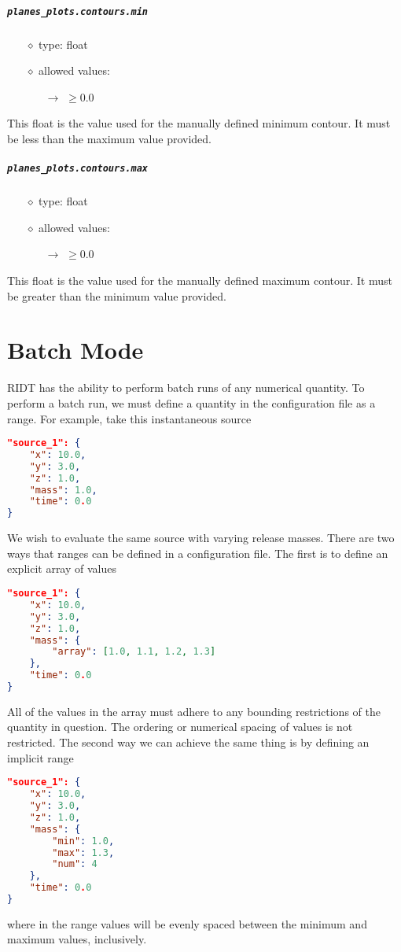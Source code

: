 \documentclass[]{article}
\def\code#1{\texttt{#1}}
\begin{document}
\subparagraph{\code{planes\_plots.contours.min}}
\begin{itemize}
    \item[$\diamond$] type: float 
    \item[$\diamond$] allowed values:
    \begin{itemize}
        \item[$\rightarrow$] $\geq0.0$
    \end{itemize}
\end{itemize}
This float is the value used for the manually defined minimum contour. It must
be less than the maximum value provided.

\subparagraph{\code{planes\_plots.contours.max}}
\begin{itemize}
    \item[$\diamond$] type: float 
    \item[$\diamond$] allowed values:
    \begin{itemize}
        \item[$\rightarrow$] $\geq0.0$
    \end{itemize}
\end{itemize}
This float is the value used for the manually defined maximum contour. It must
be greater than the minimum value provided.

\section{Batch Mode}
RIDT has the ability to perform batch runs of any numerical quantity. To perform
a batch run, we must define a quantity in the configuration file as a range.
For example, take this instantaneous source\\
\begin{lstlisting}[language=json,firstnumber=1]
"source_1": {
    "x": 10.0,
    "y": 3.0,
    "z": 1.0,
    "mass": 1.0,
    "time": 0.0
}
\end{lstlisting}
\medskip
We wish to evaluate the same source with varying release masses. There are two
ways that ranges can be defined in a configuration file. The first is to define
an explicit array of values\\
\begin{lstlisting}[language=json,firstnumber=1]
"source_1": {
    "x": 10.0,
    "y": 3.0,
    "z": 1.0,
    "mass": {
        "array": [1.0, 1.1, 1.2, 1.3]
    },
    "time": 0.0
}
\end{lstlisting}
\medskip
All of the values in the array must adhere to any bounding restrictions of the
quantity in question. The ordering or numerical spacing of values is not
restricted. The second way we can achieve the same thing is by defining an
implicit range\\
\begin{lstlisting}[language=json,firstnumber=1]
"source_1": {
    "x": 10.0,
    "y": 3.0,
    "z": 1.0,
    "mass": {
        "min": 1.0,
        "max": 1.3,
        "num": 4
    },
    "time": 0.0
}
\end{lstlisting}
\medskip
where in the range values will be evenly spaced between the minimum and maximum
values, inclusively.\\
\end{document}
